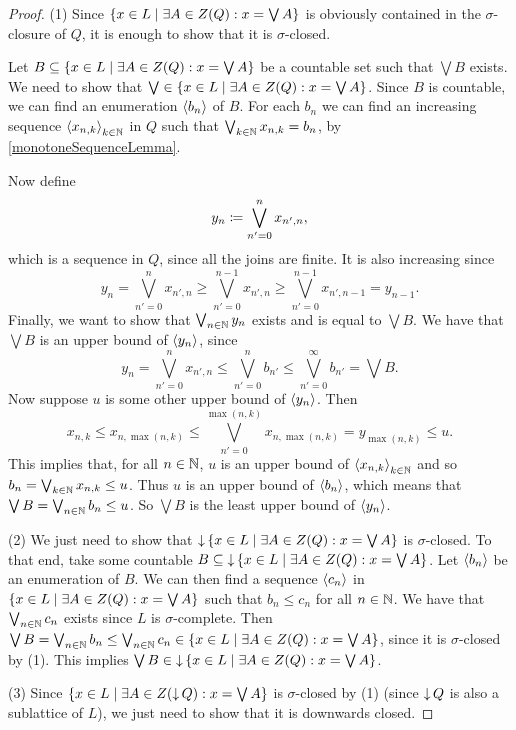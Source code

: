 \begin{proof}
(1) Since $\setbuilder{x\in L}{\exists A\in Z(Q): x = \bigvee A}$ is obviously contained in the $\sigma$-closure of $Q$, it is enough to show that it is $\sigma$-closed.

Let $B\subseteq \setbuilder{x\in L}{\exists A\in Z(Q): x = \bigvee A}$ be a countable set such that $\bigvee B$ exists. We need to show that $\bigvee \in \setbuilder{x\in L}{\exists A\in Z(Q): x = \bigvee A}$. Since $B$ is countable, we can find an enumeration $\left\langle b_n \right\rangle$ of $B$. For each $b_n$ we can find an increasing sequence $\left\langle x_{n,k} \right\rangle_{k\in \mathbb{N}}$ in $Q$ such that $\bigvee_{k\in\mathbb{N}}x_{n,k} = b_n$, by \ref{monotoneSequenceLemma}.

Now define
\[ y_n \coloneqq \bigvee_{n'= 0}^n x_{n',n}, \]
which is a sequence in $Q$, since all the joins are finite. It is also increasing since
\[ y_n = \bigvee_{n'= 0}^n x_{n',n} \geq \bigvee_{n'= 0}^{n-1} x_{n',n} \geq \bigvee_{n'= 0}^{n-1} x_{n',n-1} = y_{n-1}. \]
Finally, we want to show that $\bigvee_{n\in \mathbb{N}} y_n$ exists and is equal to $\bigvee B$. We have that $\bigvee B$ is an upper bound of $\left\langle y_n \right\rangle$, since
\[ y_n = \bigvee_{n'= 0}^n x_{n',n} \leq \bigvee_{n'= 0}^n b_{n'} \leq \bigvee_{n'= 0}^{\infty} b_{n'} = \bigvee B. \]
Now suppose $u$ is some other upper bound of $\left\langle y_n \right\rangle$. Then
\[ x_{n,k} \leq x_{n, \max(n,k)} \leq \bigvee_{n'=0}^{\max(n,k)}x_{n, \max(n,k)} = y_{\max(n,k)} \leq u. \]
This implies that, for all $n\in \mathbb{N}$, $u$ is an upper bound of $\left\langle x_{n,k} \right\rangle_{k\in \mathbb{N}}$ and so $b_n = \bigvee_{k\in \mathbb{N}}x_{n,k} \leq u$. Thus $u$ is an upper bound of $\left\langle b_n \right\rangle$, which means that $\bigvee B = \bigvee_{n\in\mathbb{N}} b_n \leq u$. So $\bigvee B$ is the least upper bound of $\left\langle y_n \right\rangle$.

(2) We just need to show that $\downset \setbuilder{x\in L}{\exists A\in Z(Q): x = \bigvee A}$ is $\sigma$-closed. To that end, take some countable $B\subseteq \downset \setbuilder{x\in L}{\exists A\in Z(Q): x = \bigvee A}$. Let $\left\langle b_n \right\rangle$ be an enumeration of $B$. We can then find a sequence $\left\langle c_n \right\rangle$ in $\setbuilder{x\in L}{\exists A\in Z(Q): x = \bigvee A}$ such that $b_n \leq c_n$ for all $n\in \mathbb{N}$. We have that $\bigvee_{n\in \mathbb{N}}c_n$ exists since $L$ is $\sigma$-complete. Then $\bigvee B = \bigvee_{n\in \N}b_n \leq \bigvee_{n\in \N}c_n \in \setbuilder{x\in L}{\exists A\in Z(Q): x = \bigvee A}$, since it is $\sigma$-closed by (1). This implies $\bigvee B \in \downset \setbuilder{x\in L}{\exists A\in Z(Q): x = \bigvee A}$.

(3) Since $\setbuilder{x\in L}{\exists A\in Z(\downset Q): x = \bigvee A}$ is $\sigma$-closed by (1) (since $\operatorname{\downarrow} Q$ is also a sublattice of $L$), we just need to show that it is downwards closed.


\end{proof}
